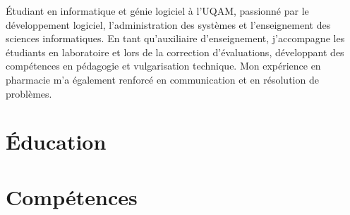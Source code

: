 \documentclass[letterpaper,10pt]{article}
\begin{document}


  Étudiant en informatique et génie logiciel à l’UQAM, passionné par le développement logiciel, l’administration des systèmes et l'enseignement des sciences informatiques. En tant qu’auxiliaire d’enseignement, j’accompagne les étudiants en laboratoire et lors de la correction d’évaluations, développant des compétences en pédagogie et vulgarisation technique. Mon expérience en pharmacie m’a également renforcé en communication et en résolution de problèmes.


  \section{Éducation}

  \vspace{10pt}


  \section{Compétences}
\end{document}
